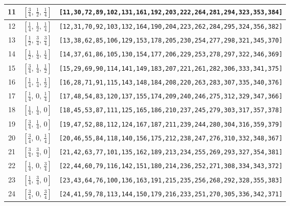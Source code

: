 \documentclass[fleqn,8pt]{jsarticle}
\begin{document}
\begin{longtable}{ccc}
11 & $\left[ \frac{3}{4},\, \frac{1}{2},\, \frac{1}{4} \right]$ & {\tt [11,30,72,89,102,131,161,192,203,222,264,281,294,323,353,384]} \\ \hline
12 & $\left[ \frac{1}{4},\, \frac{1}{2},\, \frac{1}{4} \right]$ & {\tt [12,31,70,92,103,132,164,190,204,223,262,284,295,324,356,382]} \\ \hline
13 & $\left[ \frac{1}{2},\, \frac{3}{4},\, \frac{3}{4} \right]$ & {\tt [13,38,62,85,106,129,153,178,205,230,254,277,298,321,345,370]} \\ \hline
14 & $\left[ \frac{1}{2},\, \frac{1}{4},\, \frac{1}{4} \right]$ & {\tt [14,37,61,86,105,130,154,177,206,229,253,278,297,322,346,369]} \\ \hline
15 & $\left[ \frac{3}{4},\, \frac{1}{4},\, \frac{1}{2} \right]$ & {\tt [15,29,69,90,114,141,149,183,207,221,261,282,306,333,341,375]} \\ \hline
16 & $\left[ \frac{1}{4},\, \frac{1}{4},\, \frac{1}{2} \right]$ & {\tt [16,28,71,91,115,143,148,184,208,220,263,283,307,335,340,376]} \\ \hline
17 & $\left[ \frac{1}{4},\, 0,\, \frac{1}{4} \right]$ & {\tt [17,48,54,83,120,137,155,174,209,240,246,275,312,329,347,366]} \\ \hline
18 & $\left[ \frac{1}{4},\, \frac{1}{4},\, 0 \right]$ & {\tt [18,45,53,87,111,125,165,186,210,237,245,279,303,317,357,378]} \\ \hline
19 & $\left[ \frac{3}{4},\, \frac{1}{4},\, 0 \right]$ & {\tt [19,47,52,88,112,124,167,187,211,239,244,280,304,316,359,379]} \\ \hline
20 & $\left[ \frac{3}{4},\, 0,\, \frac{1}{4} \right]$ & {\tt [20,46,55,84,118,140,156,175,212,238,247,276,310,332,348,367]} \\ \hline
21 & $\left[ \frac{3}{4},\, \frac{3}{4},\, 0 \right]$ & {\tt [21,42,63,77,101,135,162,189,213,234,255,269,293,327,354,381]} \\ \hline
22 & $\left[ \frac{1}{4},\, 0,\, \frac{3}{4} \right]$ & {\tt [22,44,60,79,116,142,151,180,214,236,252,271,308,334,343,372]} \\ \hline
23 & $\left[ \frac{1}{4},\, \frac{3}{4},\, 0 \right]$ & {\tt [23,43,64,76,100,136,163,191,215,235,256,268,292,328,355,383]} \\ \hline
24 & $\left[ \frac{3}{4},\, 0,\, \frac{3}{4} \right]$ & {\tt [24,41,59,78,113,144,150,179,216,233,251,270,305,336,342,371]} \\
\end{longtable}
\renewcommand{\arraystretch}{1.2}
\end{document}
